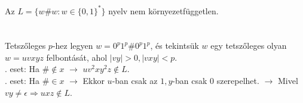\begin{frame}
\begin{tcolorbox}[title={Tétel: Példa nem környezetfüggetlen nyelvre 2}]
Az $L = \{w\#w : w \in \{0, 1\}^* \}$ nyelv nem környezetfüggetlen.\\
\tcblower
\msmallskip
\underline{}\\
\mmedskip
\\
Tetszőleges $p$-hez legyen $w = 0^p1^p\#0^p1^p$, és tekintsük $w$ egy tetszőleges olyan $w = uvxyz$ felbontását, ahol $|vy| > 0, |vxy| < p$.\\
. eset: Ha $\# \notin x$ $\rightarrow$ $uv^2xy^2z \notin L$.\\
. eset: Ha $\# \in x$ $\rightarrow$ Ekkor $u$-ban csak az $1, y$-ban csak $0$ szerepelhet. $\rightarrow$ Mivel $vy \neq \epsilon \Rightarrow uxz \notin L$.
\end{tcolorbox}
\end{frame}


